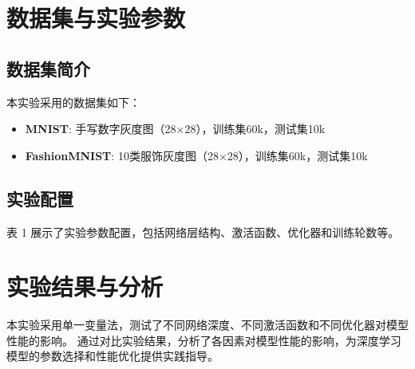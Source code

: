 \documentclass[a4paper, twocolumn]{article}
\begin{document}
\section{数据集与实验参数}

\subsection{数据集简介}
本实验采用的数据集如下：
\begin{itemize}
    \item \textbf{MNIST}: 手写数字灰度图（28×28），训练集60k，测试集10k
    \item \textbf{FashionMNIST}: 10类服饰灰度图（28×28），训练集60k，测试集10k
\end{itemize}

\subsection{实验配置}
表 1 展示了实验参数配置，包括网络层结构、激活函数、优化器和训练轮数等。
\begin{table}[H]
    \centering
    \caption{实验参数配置}
    \label{tab:config}
\end{table}

\section{实验结果与分析}
本实验采用单一变量法，测试了不同网络深度、不同激活函数和不同优化器对模型性能的影响。
通过对比实验结果，分析了各因素对模型性能的影响，为深度学习模型的参数选择和性能优化提供实践指导。
\end{document}
